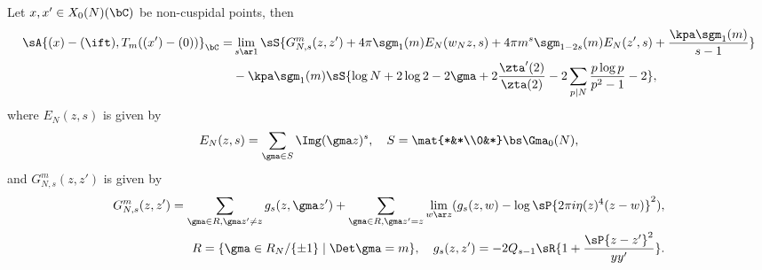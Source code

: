 \documentclass[a4paper, twoside]{article}
\begin{document}
\begin{thm}[{\cite[II.2.23, II.5.7]{GZ1986}}]\label{thm:overC}
	Let $x,x'\in X_{0}(N)(\bC)$ be non-cuspidal points, then
	\begin{align*}
		\sA{(x)-(\ift),T_{m}((x')-(0))}_{\bC}=&\lim_{s\ar 1}\sS{G_{N,s}^{m}(z,z')+4\pi\sgm_{1}(m)E_{N}(w_{N}z,s)+4\pi m^{s}\sgm_{1-2s}(m)E_{N}(z',s)+\frac{\kpa\sgm_{1}(m)}{s-1}}\\
	  &-\kpa\sgm_{1}(m)\sS{\log N+2\log 2-2\gma+2\frac{\zta'(2)}{\zta(2)}-2\sum_{p\mid N}\frac{p\log p}{p^{2}-1}-2},
	\end{align*}
	where $E_{N}(z,s)$ is given by
	\[
		E_{N}(z,s) = \sum_{\gma\in S}\Img(\gma z)^{s},\quad S=\mat{*&*\\0&*}\bs\Gma_{0}(N),
	\]
	and $G_{N,s}^{m}(z,z')$ is given by
	\begin{align*}
	  G_{N,s}^{m}(z,z') = \sum\limits_{\gma\in R, \gma z'\neq z}g_{s}(z,\gma z') +\sum\limits_{\gma\in R, \gma z'=z}\lim\limits_{w\ar z}(g_{s}(z,w)-\log\sP{2\pi i\eta(z)^{4}(z-w)}^{2}),\\
	  R=\{\gma\in R_{N}/\{\pm1\}\mid \Det\gma=m\},\quad g_{s}(z,z')=-2Q_{s-1}\sR{1+\frac{\sP{z-z'}^{2}}{yy'}}.
	\end{align*}
\end{thm}
\end{document}
